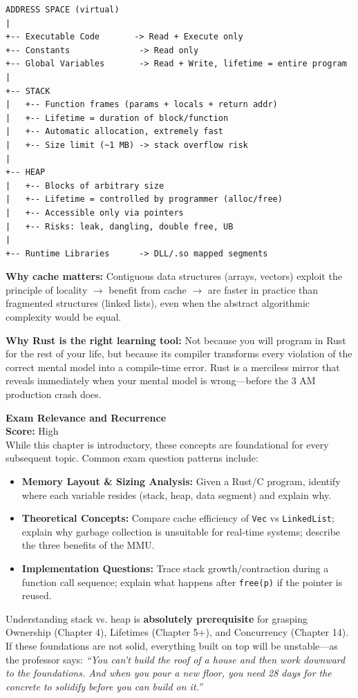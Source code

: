 \begin{lstlisting}[language={},basicstyle=\ttfamily\small,frame=single]
ADDRESS SPACE (virtual)
|
+-- Executable Code       -> Read + Execute only
+-- Constants              -> Read only
+-- Global Variables       -> Read + Write, lifetime = entire program
|
+-- STACK
|   +-- Function frames (params + locals + return addr)
|   +-- Lifetime = duration of block/function
|   +-- Automatic allocation, extremely fast
|   +-- Size limit (~1 MB) -> stack overflow risk
|
+-- HEAP
|   +-- Blocks of arbitrary size
|   +-- Lifetime = controlled by programmer (alloc/free)
|   +-- Accessible only via pointers
|   +-- Risks: leak, dangling, double free, UB
|
+-- Runtime Libraries      -> DLL/.so mapped segments
\end{lstlisting}

\textbf{Why cache matters:} Contiguous data structures (arrays, vectors) exploit the principle of locality $\rightarrow$ benefit from cache $\rightarrow$ are faster in practice than fragmented structures (linked lists), even when the abstract algorithmic complexity would be equal.

\textbf{Why Rust is the right learning tool:} Not because you will program in Rust for the rest of your life, but because its compiler transforms every violation of the correct mental model into a compile-time error. Rust is a merciless mirror that reveals immediately when your mental model is wrong---before the 3 AM production crash does.

\begin{exambox}
\textbf{Exam Relevance and Recurrence} \\
\textbf{Score:} High \\

While this chapter is introductory, these concepts are foundational for every subsequent topic. Common exam question patterns include:
\begin{itemize}
    \item \textbf{Memory Layout \& Sizing Analysis:} Given a Rust/C program, identify where each variable resides (stack, heap, data segment) and explain why.
    \item \textbf{Theoretical Concepts:} Compare cache efficiency of \texttt{Vec} vs \texttt{LinkedList}; explain why garbage collection is unsuitable for real-time systems; describe the three benefits of the MMU.
    \item \textbf{Implementation Questions:} Trace stack growth/contraction during a function call sequence; explain what happens after \texttt{free(p)} if the pointer is reused.
\end{itemize}

Understanding stack vs. heap is \textbf{absolutely prerequisite} for grasping Ownership (Chapter 4), Lifetimes (Chapter 5+), and Concurrency (Chapter 14). If these foundations are not solid, everything built on top will be unstable---as the professor says: \emph{``You can't build the roof of a house and then work downward to the foundations. And when you pour a new floor, you need 28 days for the concrete to solidify before you can build on it.''}
\end{exambox}

